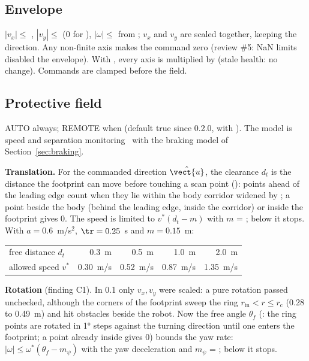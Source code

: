 \subsection{Envelope}

$|v_x| \le$ , $|v_y| \le$  (0 for ), $|\omega| \le$
 from ; $v_x$ and $v_y$ are scaled together, keeping the
direction. Any non-finite axis makes the command zero (review \#5: NaN limits disabled the
envelope). With , every axis is multiplied by 
(stale health: no change). Commands are clamped before the field.

\subsection{Protective field}

AUTO always; REMOTE when  (default true since 0.2.0, with
). The model is speed and separation
monitoring~\cite{isots15066,marvel2016ssm} with the braking model of
Section~\ref{sec:braking}.

\textbf{Translation.} For the commanded direction $\hat{\vect{u}}$, the clearance $d_t$ is the
distance the footprint can move before touching a scan point
(): points ahead of the leading edge count when they lie within the
body corridor widened by ; a point beside the body (behind the
leading edge, inside the corridor) or inside the footprint gives 0. The speed is limited to
$v^*(d_t - m)$ with $m$ = ; below  it stops. With
$a = 0.6$~m/s$^2$, $\tr = 0.25$~s and $m = 0.15$~m:
\begin{center}
\begin{tabular}{@{}lrrrr@{}}
  \toprule
  free distance $d_t$ & 0.3~m & 0.5~m & 1.0~m & 2.0~m \\
  allowed speed $v^*$ & 0.30~m/s & 0.52~m/s & 0.87~m/s & 1.35~m/s \\
  \bottomrule
\end{tabular}
\end{center}

\textbf{Rotation} (finding C1). In 0.1 only $v_x, v_y$ were scaled: a pure rotation passed
unchecked, although the corners of the footprint sweep the ring $r_{\mathrm{in}} < r \le
r_{\mathrm{c}}$ (0.28 to 0.49~m) and hit obstacles beside the robot. Now the free angle
$\theta_f$ (: the ring points are rotated in 1° steps against the turning
direction until one enters the footprint; a point already inside gives 0) bounds the yaw rate:
$|\omega| \le \omega^*(\theta_f - m_\psi)$ with the yaw deceleration  and
$m_\psi$ = ; below  it stops.


